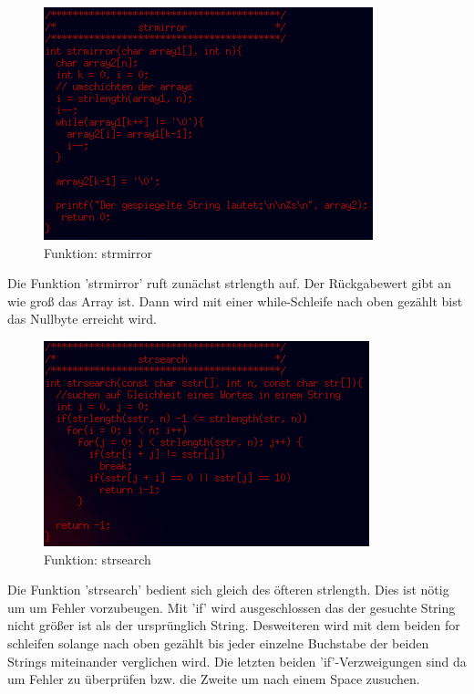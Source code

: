 \documentclass{scrartcl}
\begin{document}
\begin{figure}[H]
  \centering
  \includegraphics[width=0.9\linewidth]{images/strmirror.png}
  \caption{Funktion: strmirror}
  \label{fig:digraph}
\end{figure}
Die Funktion 'strmirror' ruft zunächst strlength auf. Der Rückgabewert gibt an wie groß das Array ist. Dann wird mit einer while-Schleife nach oben gezählt bist das Nullbyte erreicht wird.

\begin{figure}[H]
  \centering
  \includegraphics[width=0.9\linewidth]{images/strsearch.png}
  \caption{Funktion: strsearch}
  \label{fig:digraph}
\end{figure}
Die Funktion 'strsearch' bedient sich gleich des öfteren strlength. Dies ist nötig um um Fehler vorzubeugen. Mit 'if' wird ausgeschlossen das der gesuchte String nicht größer ist als der ursprünglich String. Desweiteren wird mit dem beiden for schleifen solange nach oben gezählt bis jeder einzelne Buchstabe der beiden Strings miteinander verglichen wird. Die letzten beiden 'if'-Verzweigungen sind da um Fehler zu überprüfen bzw. die Zweite um nach einem Space zusuchen.
\end{document}
